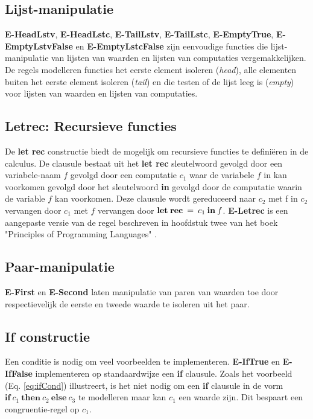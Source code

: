 \subsection{Lijst-manipulatie}
\textbf{E-HeadLstv}, \textbf{E-HeadLstc}, \textbf{E-TailLstv}, \textbf{E-TailLstc}, \textbf{E-EmptyTrue}, \textbf{E-EmptyLstvFalse} en \textbf{E-EmptyLstcFalse} zijn eenvoudige functies die lijst-manipulatie van lijsten van waarden en lijsten van computaties vergemakkelijken. De regels modelleren functies het eerste element isoleren (\emph{head}), alle elementen buiten het eerste element isoleren (\emph{tail}) en die testen of de lijst leeg is (\emph{empty}) voor lijsten van waarden en lijsten van computaties.

\subsection{Letrec: Recursieve functies}
De \textbf{let rec} constructie biedt de mogelijk om recursieve functies te definiëren in de calculus. De clausule bestaat uit het \textbf{let rec} sleutelwoord gevolgd door een variabele-naam $f$ gevolgd door een computatie $c_{1}$ waar de variabele $f$ in kan voorkomen gevolgd door het sleutelwoord \textbf{in} gevolgd door de computatie waarin de variable $f$ kan voorkomen. Deze clausule wordt gereduceerd naar $c_{2}$ met f in $c_{2}$ vervangen door $c_{1}$ met $f$ vervangen door $\textbf{let\:rec}\:=\:c_{1}\:\textbf{in}\:f$. \textbf{E-Letrec} is een aangepaste versie van de regel beschreven in hoofdstuk twee van het boek "Principles of Programming Languages" \cite{Palmer2009}.

\subsection{Paar-manipulatie}
\textbf{E-First} en \textbf{E-Second} laten manipulatie van paren van waarden toe door respectievelijk de eerste en tweede waarde te isoleren uit het paar.

\subsection{If constructie}
Een conditie is nodig om veel voorbeelden te implementeren.
\textbf{E-IfTrue} en \textbf{E-IfFalse} implementeren op standaardwijze een \textbf{if} clausule. Zoals het voorbeeld (Eq. \ref{eq:ifCond}) illustreert, is het niet nodig om een \textbf{if} clausule in de vorm $\textbf{if} \  c_1 \  \textbf{then} \  c_2 \  \textbf{else} \  c_3$ te modelleren maar kan $c_1$ een waarde zijn. Dit bespaart een congruentie-regel op $c_1$.

